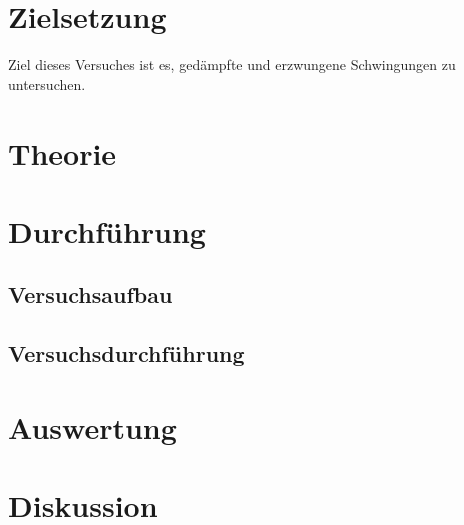 \maketitle
\tableofcontents
\newpage

\section{Zielsetzung}
Ziel dieses Versuches ist es, gedämpfte und erzwungene Schwingungen zu untersuchen.
\section{Theorie}

\section{Durchführung}

\subsection{Versuchsaufbau}

\subsection{Versuchsdurchführung}
\section{Auswertung}

\section{Diskussion}
\newpage
\nocite{*}
\printbibliography

